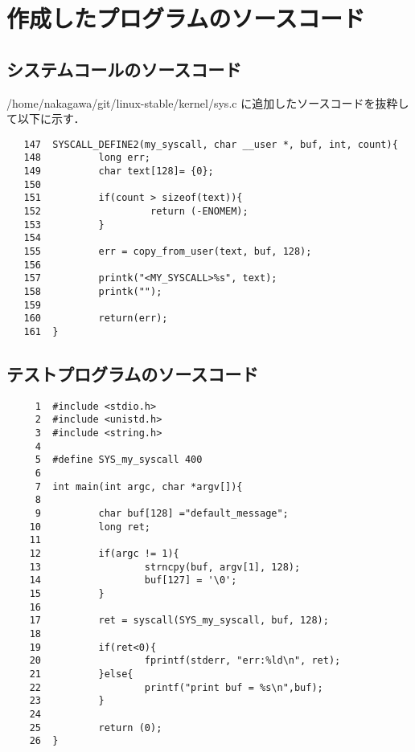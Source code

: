 \documentclass[12pt]{jsarticle}
\begin{document}
\section{作成したプログラムのソースコード}
\subsection{システムコールのソースコード}\label{sec:syscall}
 /home/nakagawa/git/linux-stable/kernel/sys.c に追加したソースコードを抜粋して以下に示す．
\begin{verbatim}
   147	SYSCALL_DEFINE2(my_syscall, char __user *, buf, int, count){
   148	        long err;
   149	        char text[128]= {0};
   150	
   151	        if(count > sizeof(text)){
   152	                 return (-ENOMEM);
   153	        }
   154	
   155	        err = copy_from_user(text, buf, 128);
   156	
   157	        printk("<MY_SYSCALL>%s", text);
   158	        printk("");
   159	
   160	        return(err);
   161	}
\end{verbatim}
 \subsection{テストプログラムのソースコード}\label{sec:test}
\begin{verbatim}
     1	#include <stdio.h>
     2	#include <unistd.h>
     3	#include <string.h>
     4	
     5	#define SYS_my_syscall 400
     6	
     7	int main(int argc, char *argv[]){
     8	
     9	        char buf[128] ="default_message";
    10	        long ret;
    11	
    12	        if(argc != 1){
    13	                strncpy(buf, argv[1], 128);
    14	                buf[127] = '\0';
    15	        }
    16	
    17	        ret = syscall(SYS_my_syscall, buf, 128);
    18	
    19	        if(ret<0){
    20	                fprintf(stderr, "err:%ld\n", ret);
    21	        }else{
    22	                printf("print buf = %s\n",buf);
    23	        }
    24	
    25	        return (0);
    26	}
\end{verbatim}

%
\end{document}
